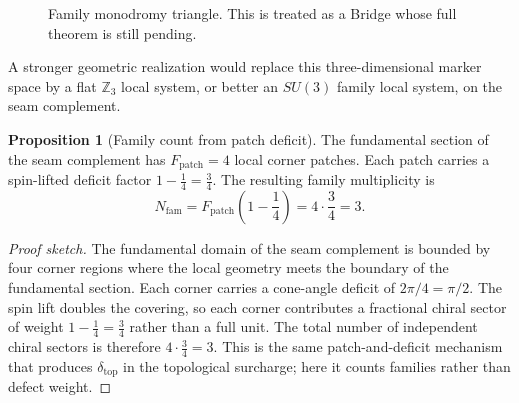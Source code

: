 \documentclass[11pt,a4paper]{article}
\theoremstyle{definition}
\newtheorem{proposition}[theorem]{Proposition}
\theoremstyle{remark}
\newcommand{\deltatop}{\delta_{\mathrm{top}}}
\begin{document}
\begin{figure}[t]
\centering
{}
\caption{Family monodromy triangle. This is treated as a Bridge whose full theorem is still pending.}
\label{fig:family-triangle}
\end{figure}

A stronger geometric realization would replace this three-dimensional marker space by a flat $\mathbb Z_3$ local system, or better an $SU(3)$ family local system, on the seam complement.

\begin{proposition}[Family count from patch deficit]
The fundamental section of the seam complement has $F_{\mathrm{patch}}=4$ local corner patches. Each patch carries a spin-lifted deficit factor $1-\frac14=\frac34$. The resulting family multiplicity is
\begin{equation}
\label{eq:family-patch-deficit}
N_{\mathrm{fam}}=F_{\mathrm{patch}}\!\left(1-\frac14\right)=4\cdot\frac34=3.
\end{equation}
\end{proposition}

\begin{proof}[Proof sketch]
The fundamental domain of the seam complement is bounded by four corner regions where the local geometry meets the boundary of the fundamental section. Each corner carries a cone-angle deficit of $2\pi/4=\pi/2$. The spin lift doubles the covering, so each corner contributes a fractional chiral sector of weight $1-\frac{1}{4}=\frac{3}{4}$ rather than a full unit. The total number of independent chiral sectors is therefore $4\cdot\frac{3}{4}=3$. This is the same patch-and-deficit mechanism that produces $\deltatop$ in the topological surcharge; here it counts families rather than defect weight.
\end{proof}
\end{document}
